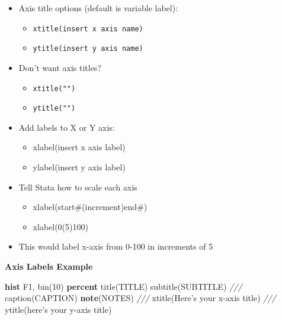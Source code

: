\documentclass[
]{book}
\newenvironment{Shaded}{\begin{snugshade}}{\end{snugshade}}
\newcommand{\BaseNTok}[1]{\textcolor[rgb]{0.00,0.00,0.81}{#1}}
\newcommand{\CommentTok}[1]{\textcolor[rgb]{0.56,0.35,0.01}{\textit{#1}}}
\newcommand{\FunctionTok}[1]{\textcolor[rgb]{0.00,0.00,0.00}{#1}}
\newcommand{\KeywordTok}[1]{\textcolor[rgb]{0.13,0.29,0.53}{\textbf{#1}}}
\newcommand{\NormalTok}[1]{#1}
\providecommand{\tightlist}{%
  \setlength{\itemsep}{0pt}\setlength{\parskip}{0pt}}
\begin{document}
\begin{itemize}
\tightlist
\item
  Axis title options (default is variable label):

  \begin{itemize}
  \tightlist
  \item
    \texttt{xtitle(insert\ x\ axis\ name)}
  \item
    \texttt{ytitle(insert\ y\ axis\ name)}
  \end{itemize}
\item
  Don't want axis titles?

  \begin{itemize}
  \tightlist
  \item
    \texttt{xtitle("")}
  \item
    \texttt{ytitle("")}
  \end{itemize}
\item
  Add labels to X or Y axis:

  \begin{itemize}
  \tightlist
  \item
    xlabel(insert x axis label)
  \item
    ylabel(insert y axis label)
  \end{itemize}
\item
  Tell Stata how to scale each axis

  \begin{itemize}
  \tightlist
  \item
    xlabel(start\#(increment)end\#)
  \item
    xlabel(0(5)100)
  \end{itemize}
\item
  This would label x-axis from 0-100 in increments of 5
\end{itemize}

\textbf{Axis Labels Example}

\begin{Shaded}
\begin{Highlighting}[]
  \KeywordTok{hist}\NormalTok{ F1, }\BaseNTok{bin}\NormalTok{(10) }\KeywordTok{percent} \BaseNTok{title}\NormalTok{(TITLE) }\BaseNTok{subtitle}\NormalTok{(SUBTITLE) }\CommentTok{///}
      \BaseNTok{caption}\NormalTok{(CAPTION) }\KeywordTok{note}\NormalTok{(NOTES) }\CommentTok{///}
      \BaseNTok{xtitle}\NormalTok{(Here's your x-axis }\BaseNTok{title}\NormalTok{) }\CommentTok{///}
  \BaseNTok{ytitle}\NormalTok{(here's your }\FunctionTok{y}\NormalTok{-axis }\BaseNTok{title}\NormalTok{)}
\end{Highlighting}
\end{Shaded}
\end{document}
